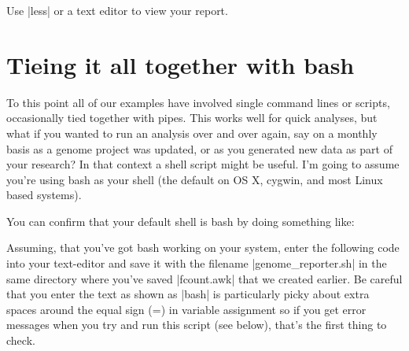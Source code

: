 
Use |less| or a text editor to view your report.

\section*{Tieing it all together with bash}

To this point all of our examples have involved single command lines or scripts, occasionally tied together with pipes.  This works well for quick analyses, but what if you wanted to run an analysis over and over again, say on a monthly basis as a genome project was updated, or as you generated new data as part of your research?  In that context a shell script might be useful. I'm going to assume you're using bash as your shell (the default on OS X, cygwin, and most Linux based systems).

You can confirm that your default shell is bash by doing something like:

Assuming, that you've got bash working on your system, enter the following code into your text-editor and save it with the filename |genome_reporter.sh| in the same directory where you've saved |fcount.awk| that we created earlier. Be careful that you enter the text as shown as |bash| is particularly picky about extra spaces around the equal sign (=) in variable assignment so if you get error messages when you try and run this script (see below), that's the first thing to check.

